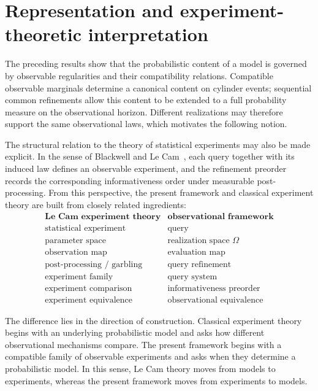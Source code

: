 \section{Representation and experiment-theoretic interpretation}

The preceding results show that the probabilistic content of a model is
governed by observable regularities and their compatibility relations.
Compatible observable marginals determine a canonical content on
cylinder events; sequential common refinements allow this content to
be extended to a full probability measure on the observational horizon.
Different realizations may therefore support the same observational
laws, which motivates the following notion.

The structural relation to the theory of statistical experiments may
also be made explicit.  In the sense of Blackwell and Le Cam~\cite{Blackwell,LeCam},
each query together with its induced law defines an observable experiment,
and the refinement preorder records the corresponding informativeness
order under measurable post-processing.  From this perspective, the
present framework and classical experiment theory are built from
closely related ingredients:
\[
\begin{array}{cc}
\textbf{Le Cam experiment theory} & \textbf{observational framework} \\[6pt]
\text{statistical experiment} & \text{query} \\
\text{parameter space} & \text{realization space } \Omega \\
\text{observation map} & \text{evaluation map} \\
\text{post-processing / garbling} & \text{query refinement} \\
\text{experiment family} & \text{query system} \\
\text{experiment comparison} & \text{informativeness preorder} \\
\text{experiment equivalence} & \text{observational equivalence}
\end{array}
\]

The difference lies in the direction of construction. Classical
experiment theory begins with an underlying probabilistic model and
asks how different observational mechanisms compare. The present
framework begins with a compatible family of observable experiments
and asks when they determine a probabilistic model. In this sense,
Le Cam theory moves from models to experiments, whereas the present
framework moves from experiments to models.

